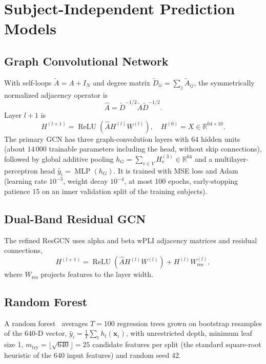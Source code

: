 \documentclass{ieeeaccess}
\begin{document}
\section{Subject-Independent Prediction Models}
\label{sec:models}

\subsection{Graph Convolutional Network}

With self-loops $\tilde A=A+I_N$ and degree matrix $\tilde D_{ii}=\sum_j\tilde A_{ij}$, the symmetrically normalized adjacency operator is
\begin{equation}
\hat A=\tilde D^{-1/2}\tilde A\tilde D^{-1/2}.
\end{equation}
Layer $l+1$ is
\begin{equation}
H^{(l+1)}=\operatorname{ReLU}\!\left(\hat A H^{(l)} W^{(l)}\right),\quad H^{(0)}=X\in\mathbb{R}^{64\times10}.
\end{equation}
The primary GCN has three graph-convolution layers with 64 hidden units (about $14\,000$ trainable parameters including the head, without skip connections), followed by global additive pooling $h_G=\sum_{v\in V}H^{(3)}_v\in\mathbb{R}^{64}$ and a multilayer-perceptron head $\hat y_i=\operatorname{MLP}(h_G)$. It is trained with MSE loss and Adam (learning rate $10^{-3}$, weight decay $10^{-4}$, at most 100 epochs, early-stopping patience 15 on an inner validation split of the training subjects).

\subsection{Dual-Band Residual GCN}

The refined ResGCN uses alpha and beta wPLI adjacency matrices and residual connections,
\begin{equation}
H^{(l+1)}=\operatorname{ReLU}\!\left(\hat A H^{(l)}W^{(l)}\right)+H^{(l)}W^{(l)}_{\text{res}},
\end{equation}
where $W_{\text{res}}$ projects features to the layer width.

\subsection{Random Forest}

A random forest~\cite{breiman2001} averages $T=100$ regression trees grown on bootstrap resamples of the 640-D vector, $\hat y_i=\frac1T\sum_t h_t(\mathbf{x}_i)$, with unrestricted depth, minimum leaf size 1, $m_{\text{try}}=\lfloor\sqrt{640}\rfloor=25$ candidate features per split (the standard square-root heuristic of the 640 input features) and random seed 42.
\end{document}
